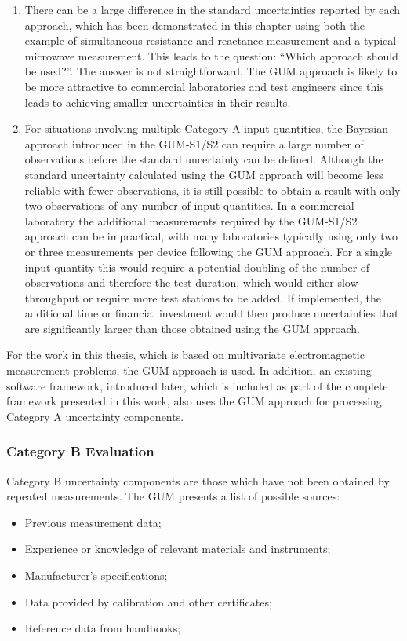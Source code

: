 \documentclass[../thesis/thesis.tex]{subfiles}
\begin{document}
\begin{refsection}
\begin{enumerate}
	\item There can be a large difference in the standard uncertainties reported by each approach, which has been demonstrated in this chapter using both the example of simultaneous resistance and reactance measurement and a typical microwave measurement. This leads to the question: ``Which approach should be used?''. The answer is not straightforward. The GUM approach is likely to be more attractive to commercial laboratories and test engineers since this leads to achieving smaller uncertainties in their results.
	\item For situations involving multiple Category A input quantities, the Bayesian approach introduced in the GUM-S1/S2 can require a large number of observations before the standard uncertainty can be defined. Although the standard uncertainty calculated using the GUM approach will become less reliable with fewer observations, it is still possible to obtain a result with only two observations of any number of input quantities. In a commercial laboratory the additional measurements required by the GUM-S1/S2 approach can be impractical, with many laboratories typically using only two or three measurements per device following the GUM approach. For a single input quantity this would require a potential doubling of the number of observations and therefore the test duration, which would either slow throughput or require more test stations to be added. If implemented, the additional time or financial investment would then produce uncertainties that are significantly larger than those obtained using the GUM approach.
\end{enumerate}

For the work in this thesis, which is based on multivariate electromagnetic measurement problems, the GUM approach is used. In addition, an existing software framework, introduced later, which is included as part of the complete framework presented in this work, also uses the GUM approach for processing Category A uncertainty components.

\subsubsection{Category B Evaluation}

Category B uncertainty components are those which have not been obtained by repeated measurements. The GUM presents a list of possible sources:

\begin{itemize}
	\item Previous measurement data;
	\item Experience or knowledge of relevant materials and instruments;
	\item Manufacturer’s specifications;
	\item Data provided by calibration and other certificates;
	\item Reference data from handbooks;
\end{itemize}


\end{refsection}
\end{document}
